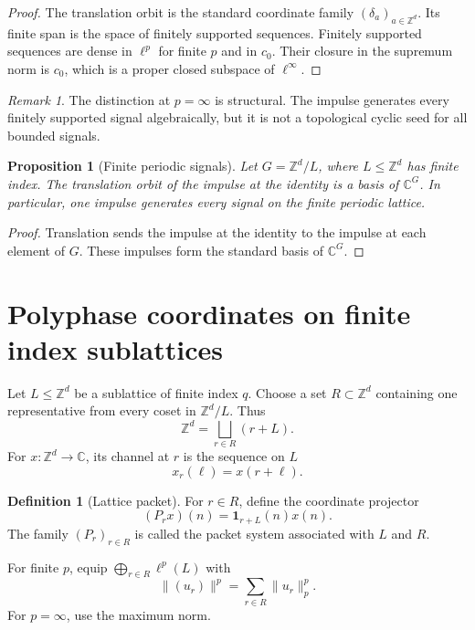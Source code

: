 \documentclass[11pt,letterpaper]{article}
\theoremstyle{plain}
\newtheorem{proposition}[proposition]{Proposition}
\theoremstyle{plain}
\theoremstyle{plain}
\theoremstyle{definition}
\newtheorem{definition}[definition]{Definition}
\theoremstyle{definition}
\theoremstyle{definition}
\theoremstyle{definition}
\theoremstyle{remark}
\newtheorem{remark}[remark]{Remark}
\theoremstyle{remark}
\theoremstyle{remark}
\theoremstyle{remark}
\newcommand{\CC}{\mathbb C}
\newcommand{\ZZ}{\mathbb Z}
\newcommand{\one}{\mathbf 1}
\begin{document}
\begin{proof}
The translation orbit is the standard coordinate family \((\delta_a)_{a\in\ZZ^d}\). Its finite span is the space of finitely supported sequences. Finitely supported sequences are dense in \(\ell^p\) for finite \(p\) and in \(c_0\). Their closure in the supremum norm is \(c_0\), which is a proper closed subspace of \(\ell^\infty\).
\end{proof}

\begin{remark}\label{rem:infinity_boundary}
The distinction at \(p=\infty\) is structural. The impulse generates every finitely supported signal algebraically, but it is not a topological cyclic seed for all bounded signals.
\end{remark}

\begin{proposition}[Finite periodic signals]\label{prop:finite_periodic}
Let \(G=\ZZ^d/L\), where \(L\leq\ZZ^d\) has finite index. The translation orbit of the impulse at the identity is a basis of \(\CC^G\). In particular, one impulse generates every signal on the finite periodic lattice.
\end{proposition}

\begin{proof}
Translation sends the impulse at the identity to the impulse at each element of \(G\). These impulses form the standard basis of \(\CC^G\).
\end{proof}

\section{Polyphase coordinates on finite index sublattices}\label{extension:section:03}\label{sec:polyphase}

Let \(L\leq\ZZ^d\) be a sublattice of finite index \(q\). Choose a set \(R\subset\ZZ^d\) containing one representative from every coset in \(\ZZ^d/L\). Thus
\[
\ZZ^d=\bigsqcup_{r\in R}(r+L).
\]
For \(x:\ZZ^d\to\CC\), its channel at \(r\) is the sequence on \(L\)
\[
x_r(\ell)=x(r+\ell).
\]

\begin{definition}[Lattice packet]\label{def:lattice_packet}
For \(r\in R\), define the coordinate projector
\[
(P_rx)(n)=\one_{r+L}(n)x(n).
\]
The family \((P_r)_{r\in R}\) is called the packet system associated with \(L\) and \(R\).
\end{definition}

For finite \(p\), equip \(\bigoplus_{r\in R}\ell^p(L)\) with
\[
\|(u_r)\|^p=\sum_{r\in R}\|u_r\|_p^p.
\]
For \(p=\infty\), use the maximum norm.
\end{document}
